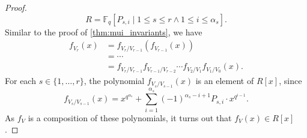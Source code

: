 \documentclass[12pt,a4paper]{report}
\theoremstyle{definition}
\theoremstyle{remark}
\theoremstyle{definition}
\begin{document}
\begin{proof}
    \begin{equation*}
        R = \mathbb{F}_q[P_{s, i}\mid 1\leq s\leq r \land 1\leq i\leq \alpha_s].
    \end{equation*}
    Similar to the proof of \cref{thm:mui_invariants}, we have
    \begin{align*}
        f_{V_r}(x) &= f_{V_r/V_{r-1}}(f_{V_{r-1}}(x))\\
        & = \cdots \\
        & = f_{V_r/V_{r-1}}f_{V_{r-1}/V_{r-2}}\cdots f_{V_2/V_1}f_{V_1/V_0}(x).
    \end{align*}
    For each $s\in \{1, \ldots, r\}$, the polynomial $f_{V_s/V_{s-1}}(x)$ is an element of $R[x]$, since
    \begin{equation*}
        f_{V_s/V_{s-1}}(x) = x^{q^{\alpha_s}} + \sum\limits_{i=1}^{\alpha_s}(-1)^{\alpha_s-i+1}P_{s, i}\cdot x^{q^{i-1}}.  
    \end{equation*}
    As $f_V$ is a composition of these polynomials, it turns out that $f_V(x)\in R[x]$.
\end{proof}
\end{document}
